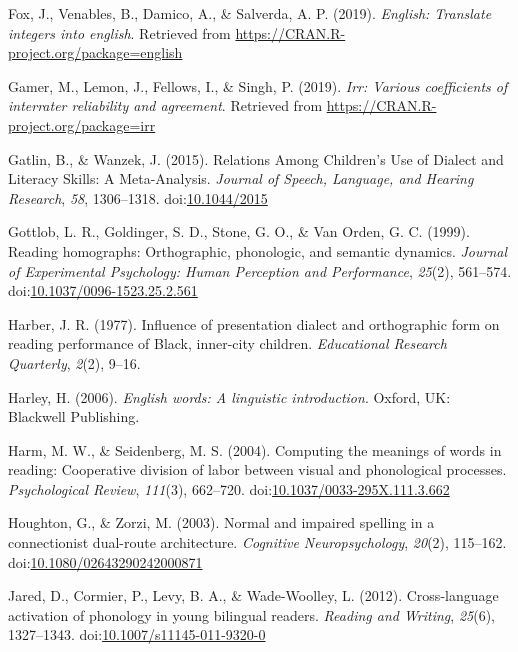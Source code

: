 \documentclass[doc,floatsintext]{apa6}
\begin{document}
\hypertarget{ref-R-english}{}
Fox, J., Venables, B., Damico, A., \& Salverda, A. P. (2019).
\emph{English: Translate integers into english}. Retrieved from
\url{https://CRAN.R-project.org/package=english}

\hypertarget{ref-R-irr}{}
Gamer, M., Lemon, J., Fellows, I., \& Singh, P. (2019). \emph{Irr:
Various coefficients of interrater reliability and agreement}. Retrieved
from \url{https://CRAN.R-project.org/package=irr}

\hypertarget{ref-Gatlin2015}{}
Gatlin, B., \& Wanzek, J. (2015). Relations Among Children's Use of
Dialect and Literacy Skills: A Meta-Analysis. \emph{Journal of Speech,
Language, and Hearing Research}, \emph{58}, 1306--1318.
doi:\href{https://doi.org/10.1044/2015}{10.1044/2015}

\hypertarget{ref-Gottlob1999}{}
Gottlob, L. R., Goldinger, S. D., Stone, G. O., \& Van Orden, G. C.
(1999). Reading homographs: Orthographic, phonologic, and semantic
dynamics. \emph{Journal of Experimental Psychology: Human Perception and
Performance}, \emph{25}(2), 561--574.
doi:\href{https://doi.org/10.1037/0096-1523.25.2.561}{10.1037/0096-1523.25.2.561}

\hypertarget{ref-Harber1977}{}
Harber, J. R. (1977). Influence of presentation dialect and orthographic
form on reading performance of Black, inner-city children.
\emph{Educational Research Quarterly}, \emph{2}(2), 9--16.

\hypertarget{ref-Harley2006}{}
Harley, H. (2006). \emph{English words: A linguistic introduction}.
Oxford, UK: Blackwell Publishing.

\hypertarget{ref-Harm2004}{}
Harm, M. W., \& Seidenberg, M. S. (2004). Computing the meanings of
words in reading: Cooperative division of labor between visual and
phonological processes. \emph{Psychological Review}, \emph{111}(3),
662--720.
doi:\href{https://doi.org/10.1037/0033-295X.111.3.662}{10.1037/0033-295X.111.3.662}

\hypertarget{ref-Houghton2003}{}
Houghton, G., \& Zorzi, M. (2003). Normal and impaired spelling in a
connectionist dual-route architecture. \emph{Cognitive Neuropsychology},
\emph{20}(2), 115--162.
doi:\href{https://doi.org/10.1080/02643290242000871}{10.1080/02643290242000871}

\hypertarget{ref-Jared2012}{}
Jared, D., Cormier, P., Levy, B. A., \& Wade-Woolley, L. (2012).
Cross-language activation of phonology in young bilingual readers.
\emph{Reading and Writing}, \emph{25}(6), 1327--1343.
doi:\href{https://doi.org/10.1007/s11145-011-9320-0}{10.1007/s11145-011-9320-0}
\end{document}
